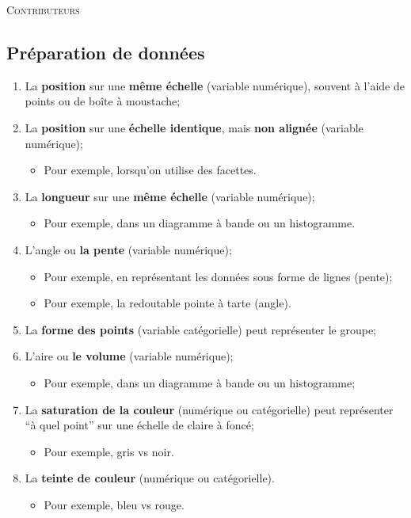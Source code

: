 \documentclass[10pt, french]{article}
\begin{document}
\begin{center}
	\textsc{\Large Contributeurs}\\[0.5cm] 
\end{center}


\newpage

\begin{multicols*}{3} 

\section{Préparation de données}

\begin{algo2}
\begin{enumerate}
	\item	La \textbf{position} sur une \textbf{même échelle} (variable numérique), souvent à l’aide de points ou de boîte à moustache;
	\item	La \textbf{position} sur une \textbf{échelle identique}, mais \textbf{non alignée} (variable numérique);
		\begin{itemize}
		\item	Pour exemple, lorsqu’on utilise des facettes.
		\end{itemize}
	\item	La \textbf{longueur} sur une \textbf{même échelle} (variable numérique);
		\begin{itemize}
		\item	Pour exemple, dans un diagramme à bande ou un histogramme.
		\end{itemize}
	\item	L’angle ou \textbf{la pente} (variable numérique);
		\begin{itemize}
		\item	Pour exemple, en représentant les données sous forme de lignes (pente);
		\item	Pour exemple, la redoutable pointe à tarte (angle).
		\end{itemize}
	\item	La \textbf{forme des points} (variable catégorielle) peut représenter le groupe;
	\item	L’aire ou \textbf{le volume} (variable numérique);
		\begin{itemize}
		\item	Pour exemple, dans un diagramme à bande ou un histogramme;
		\end{itemize}
	\item	La \textbf{saturation de la couleur} (numérique ou catégorielle) peut représenter “à quel point” sur une échelle de claire à foncé;
		\begin{itemize}
		\item	Pour exemple, gris vs noir.
		\end{itemize}
	\item	La \textbf{teinte de couleur} (numérique ou catégorielle).
		\begin{itemize}
		\item	Pour exemple, bleu vs rouge.
		\end{itemize}
\end{enumerate}
\end{algo2}


\end{multicols*}
\end{document}
